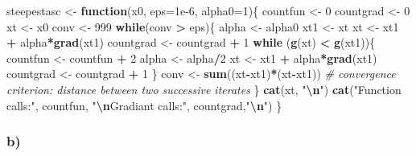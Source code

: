 \documentclass[
]{article}
\newenvironment{Shaded}{\begin{snugshade}}{\end{snugshade}}
\newcommand{\AttributeTok}[1]{\textcolor[rgb]{0.13,0.29,0.53}{#1}}
\newcommand{\CommentTok}[1]{\textcolor[rgb]{0.56,0.35,0.01}{\textit{#1}}}
\newcommand{\ControlFlowTok}[1]{\textcolor[rgb]{0.13,0.29,0.53}{\textbf{#1}}}
\newcommand{\DecValTok}[1]{\textcolor[rgb]{0.00,0.00,0.81}{#1}}
\newcommand{\FloatTok}[1]{\textcolor[rgb]{0.00,0.00,0.81}{#1}}
\newcommand{\FunctionTok}[1]{\textcolor[rgb]{0.13,0.29,0.53}{\textbf{#1}}}
\newcommand{\NormalTok}[1]{#1}
\newcommand{\OtherTok}[1]{\textcolor[rgb]{0.56,0.35,0.01}{#1}}
\newcommand{\SpecialCharTok}[1]{\textcolor[rgb]{0.81,0.36,0.00}{\textbf{#1}}}
\newcommand{\StringTok}[1]{\textcolor[rgb]{0.31,0.60,0.02}{#1}}
\begin{document}
\begin{Shaded}
\begin{Highlighting}[]
\NormalTok{steepestasc }\OtherTok{\textless{}{-}} \ControlFlowTok{function}\NormalTok{(x0, }\AttributeTok{eps=}\FloatTok{1e{-}6}\NormalTok{, }\AttributeTok{alpha0=}\DecValTok{1}\NormalTok{)\{}
\NormalTok{  countfun }\OtherTok{\textless{}{-}} \DecValTok{0}
\NormalTok{  countgrad }\OtherTok{\textless{}{-}} \DecValTok{0}
\NormalTok{  xt   }\OtherTok{\textless{}{-}}\NormalTok{ x0}
\NormalTok{  conv }\OtherTok{\textless{}{-}} \DecValTok{999}
  \ControlFlowTok{while}\NormalTok{(conv }\SpecialCharTok{\textgreater{}}\NormalTok{ eps)\{ }
\NormalTok{    alpha }\OtherTok{\textless{}{-}}\NormalTok{ alpha0}
\NormalTok{    xt1   }\OtherTok{\textless{}{-}}\NormalTok{ xt}
\NormalTok{    xt    }\OtherTok{\textless{}{-}}\NormalTok{ xt1 }\SpecialCharTok{+}\NormalTok{ alpha}\SpecialCharTok{*}\FunctionTok{grad}\NormalTok{(xt1)}
\NormalTok{    countgrad }\OtherTok{\textless{}{-}}\NormalTok{ countgrad }\SpecialCharTok{+} \DecValTok{1}
    \ControlFlowTok{while}\NormalTok{ (}\FunctionTok{g}\NormalTok{(xt) }\SpecialCharTok{\textless{}} \FunctionTok{g}\NormalTok{(xt1))\{}
\NormalTok{      countfun }\OtherTok{\textless{}{-}}\NormalTok{ countfun }\SpecialCharTok{+} \DecValTok{2}
\NormalTok{      alpha }\OtherTok{\textless{}{-}}\NormalTok{ alpha}\SpecialCharTok{/}\DecValTok{2}
\NormalTok{      xt    }\OtherTok{\textless{}{-}}\NormalTok{ xt1 }\SpecialCharTok{+}\NormalTok{ alpha}\SpecialCharTok{*}\FunctionTok{grad}\NormalTok{(xt1)}
\NormalTok{      countgrad }\OtherTok{\textless{}{-}}\NormalTok{ countgrad }\SpecialCharTok{+} \DecValTok{1}
\NormalTok{    \}}
\NormalTok{    conv }\OtherTok{\textless{}{-}} \FunctionTok{sum}\NormalTok{((xt}\SpecialCharTok{{-}}\NormalTok{xt1)}\SpecialCharTok{*}\NormalTok{(xt}\SpecialCharTok{{-}}\NormalTok{xt1)) }\CommentTok{\# convergence criterion: distance between two successive iterates}
\NormalTok{  \}}
  \FunctionTok{cat}\NormalTok{(xt, }\StringTok{"}\SpecialCharTok{\textbackslash{}n}\StringTok{"}\NormalTok{)}
  \FunctionTok{cat}\NormalTok{(}\StringTok{"Function calls:"}\NormalTok{, countfun, }\StringTok{"}\SpecialCharTok{\textbackslash{}n}\StringTok{Gradiant calls:"}\NormalTok{, countgrad,}\StringTok{"}\SpecialCharTok{\textbackslash{}n}\StringTok{"}\NormalTok{)}
\NormalTok{\}}
\end{Highlighting}
\end{Shaded}

\hypertarget{b-1}{%
\subsubsection{b)}\label{b-1}}
\end{document}

